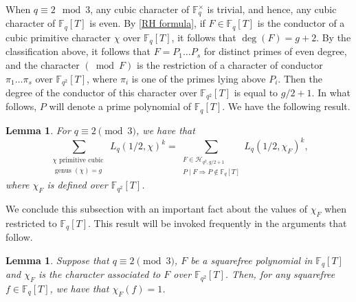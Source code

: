 \documentclass[table]{amsart}
\newtheorem{lemma}[theorem]{Lemma}
\newcommand{\F}{\mathbb{F}}
\numberwithin{equation}{section}
\begin{document}
\par When $q\equiv 2\mod{3}$, any cubic character of $\F_q^\times$ is trivial, and hence, any cubic character of $\F_q[T]$ is even.
By \eqref{RH formula}, if $F \in \mathbb{F}_{q}[T]$ is the conductor of a cubic primitive character $\chi$ over $\mathbb{F}_{q}[T]$, it follows that $\operatorname{deg}(F)=g+2$. By the classification above, it follows that $F=P_{1} \ldots P_{s}$ for distinct primes of even degree, and the character $(\bmod F)$ is the restriction of a character
of conductor $\pi_{1} \ldots \pi_{s}$ over $\mathbb{F}_{q^{2}}[T]$, where $\pi_{i}$ is one of the primes lying above $P_{i}$. Then the degree of the conductor of this character over $\mathbb{F}_{q^{2}}[T]$ is equal to $g / 2+1$. In what follows, $P$ will denote a prime polynomial of $\F_q[T]$. We have the following result.
\begin{lemma}\label{cubic sum q 2 mod 3}
For $q \equiv 2 \pmod{3}$, we have that
$$
\sum_{\substack{\chi \text { primitive cubic } \\ \text { genus }(\chi)=g}} L_{q}(1 / 2, \chi)^k=\sum_{\substack{F \in \mathcal{H}_{q^{2}, g / 2+1} \\ P \mid F \Rightarrow P \notin \mathbb{F}_{q}[T]}} L_{q}\left(1 / 2, \chi_{F}\right)^k,
$$
where $\chi_F$ is defined over $\F_{q^2}[T]$. 
\end{lemma}

We conclude this subsection with an important fact about the values of $\chi_F$ when restricted to $\F_q[T]$. This result will be invoked frequently in the arguments that follow.

\begin{lemma}\label{chi_D(f)=1 lemma}
    Suppose that $q\equiv 2\pmod{3}$, $F$ be a squarefree polynomial in $\F_q[T]$ and $\chi_F$ is the character associated to $F$ over $\F_{q^2}[T]$. Then, for any squarefree $f\in \F_q[T]$, we have that $\chi_F(f)=1$.
\end{lemma}
\end{document}
